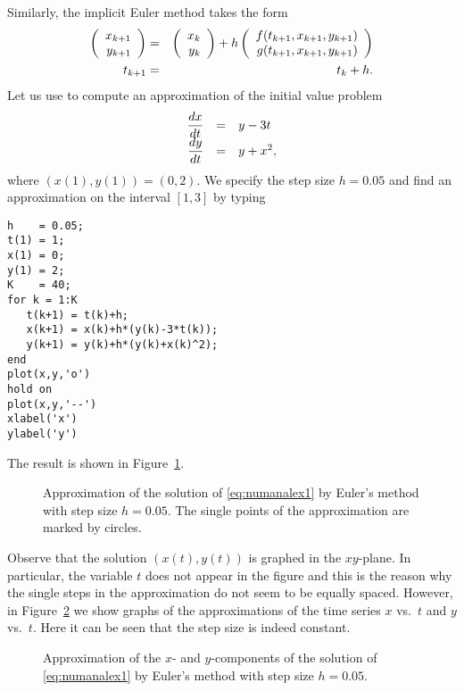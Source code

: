 \documentclass{ximera}
\begin{document}
Similarly, the implicit Euler 
method 
takes the form
\begin{eqnarray*}
\left(\begin{array}{r} x_{k+1} \\ y_{k+1}\end{array}\right) & = &  \left(\begin{array}{r} x_k \\ y_k\end{array}\right) + 
h \left(\begin{array}{r} f(t_{k+1},x_{k+1},y_{k+1}) \\ g(t_{k+1},x_{k+1},y_{k+1})\end{array}\right)\\
t_{k+1} &=& t_k + h.
\end{eqnarray*}
Let us use \Matlab to compute an approximation of the initial
value problem
\arraystart
\begin{equation}
\label{eq:numanalex1}
\begin{array}{rcl}
\displaystyle \frac{dx}{dt} & = & y-3t\\
\displaystyle \frac{dy}{dt} & = & y+x^2,
\end{array}
\end{equation}
\arrayfinish
where $(x(1),y(1))= (0,2)$.  We specify the 
step size $h=0.05$ and find an approximation on the interval 
$[1,3]$ by typing
\begin{verbatim}
h    = 0.05;
t(1) = 1;
x(1) = 0;
y(1) = 2;
K    = 40;
for k = 1:K
   t(k+1) = t(k)+h;
   x(k+1) = x(k)+h*(y(k)-3*t(k));
   y(k+1) = y(k)+h*(y(k)+x(k)^2);
end
plot(x,y,'o')
hold on
plot(x,y,'--')
xlabel('x')
ylabel('y')
\end{verbatim}
The result is shown in Figure~\ref{fig:sysEul1}.
\begin{figure}[htb]
   \centerline{%
   }
   \caption{Approximation of the solution of
   \protect\eqref{eq:numanalex1} by Euler's method
   with step size $h=0.05$.  The single points of
   the approximation are marked by circles.}
   \label{fig:sysEul1}
\end{figure}
Observe that the solution $(x(t),y(t))$ is graphed in
the $xy$-plane.
In particular, the variable $t$ does not appear in the figure 
and this is the reason why the single steps in the approximation
do not seem to be equally spaced.  However, in
Figure~\ref{fig:sysEul2} we show graphs of the approximations
of the time series $x$ vs.\ $t$ and $y$ vs.\ $t$. Here 
it can be seen that the step size is indeed constant.
\begin{figure}[htb]
   \centerline{%
   }
   \caption{Approximation of the $x$- and $y$-components
   of the solution of \protect\eqref{eq:numanalex1} by Euler's method
   with step size $h=0.05$.}
   \label{fig:sysEul2}
\end{figure}
\end{document}
